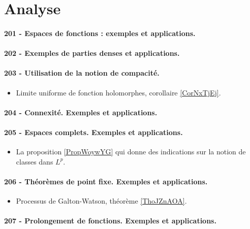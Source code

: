 \section{Analyse}


\paragraph{201 - Espaces de fonctions : exemples et applications.}
\paragraph{202 - Exemples de parties denses et applications.}
\paragraph{203 - Utilisation de la notion de compacité.}
\begin{itemize}
    \item Limite uniforme de fonction holomorphes, corollaire \ref{CorNxTjEj}.
\end{itemize}
\paragraph{204 - Connexité. Exemples et applications.}
\paragraph{205 - Espaces complets. Exemples et applications.}
\begin{itemize}
    \item La proposition \ref{PropWoywYG} qui donne des indications sur la notion de classes dans \( L^p\).
\end{itemize}
\paragraph{206 - Théorèmes de point fixe. Exemples et applications.}
\begin{itemize}
    \item Processus de Galton-Watson, théorème \ref{ThoJZnAOA}.
\end{itemize}
\paragraph{207 - Prolongement de fonctions. Exemples et applications.}
